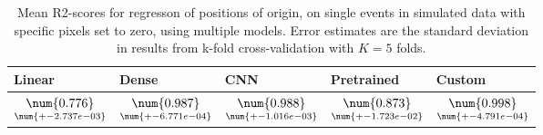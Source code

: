 \begin{table}
\centering
\caption{
Mean R2-scores for regresson of positions of origin, on single events in simulated data with specific pixels
set to zero, using multiple models. 
Error estimates are the standard deviation in results from k-fold cross-validation 
with $K=5$ folds.
}
\label{tab:regression-simulated-single-position-pixelmod-r2}
\begin{tabular}{lllll}
\toprule
                                             Linear &                                               Dense &                                                 CNN &                                          Pretrained &                                              Custom \\
\midrule
 $\underset{\num{+- 2.737e-03 }  }{\num{ 0.776 } }$ &  $\underset{\num{+- 6.771e-04 }  }{\num{ 0.987 } }$ &  $\underset{\num{+- 1.016e-03 }  }{\num{ 0.988 } }$ &  $\underset{\num{+- 1.723e-02 }  }{\num{ 0.873 } }$ &  $\underset{\num{+- 4.791e-04 }  }{\num{ 0.998 } }$ \\
\bottomrule
\end{tabular}
\end{table}
